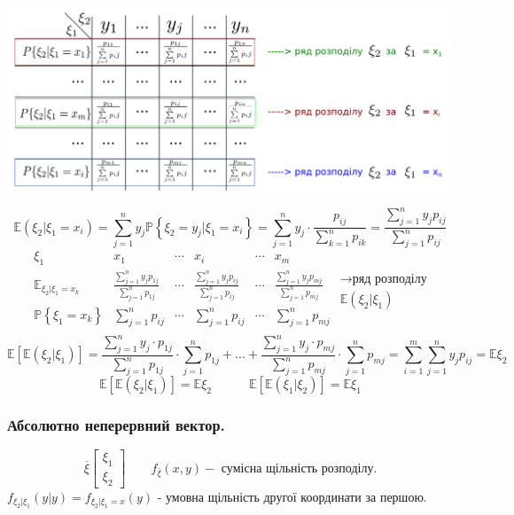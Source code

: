 \begin{center}
\includegraphics[scale=0.28]{images/20.png} \end{center}
$$
\mathbb{E}(\xi_2 | \xi_1 = x_i)  =  \sum\limits_{j = 1}^{ n}{ y_j \mathbb{P} \left\lbrace \xi_2 = y_j | \xi_1 = x_i \right\rbrace } =  \sum\limits_{j = 1}^{n}{ y_{j} \cdot \frac{p_{ij} }{  \sum\limits_{k = 1}^{ n}{p_{ik}}}}= \frac{  \sum\limits_{j = 1}^{ n}{ y_j p_{ij}}}{  \sum\limits_{j = 1}^{n}{ p_{ij}}}
$$
$$
\begin{matrix}
	\xi_1 & x_1 & \cdots  &x_i & \cdots & x_m \\
	\mathbb{E}_{\xi_2 | \xi_1=x_k}  &  \frac{  \sum\limits_{j = 1}^{ n}{ y_j p_{1j}}}{  \sum\limits_{j = 1}^{n}{ p_{1j}}}  & \cdots  &\frac{  \sum\limits_{j = 1}^{ n}{ y_j p_{ij}}}{  \sum\limits_{j = 1}^{n}{ p_{ij}}}  & \cdots & \frac{  \sum\limits_{j = 1}^{ n}{ y_j p_{mj}}}{  \sum\limits_{j = 1}^{n}{ p_{mj}}}  \\
	\mathbb{P} \left\lbrace \xi_1 = x_k \right\rbrace &   \sum\limits_{j = 1}^{n}{ p_{ij}} & \cdots  &\sum\limits_{j = 1}^{n}{ p_{ij}} & \cdots & \sum\limits_{j = 1}^{n}{ p_{mj}} \\
\end{matrix}
\begin{gathered}
\longrightarrow \text{ряд розподілу}\\
\mathbb{E}(\xi_2| \xi_1)
\end{gathered}
$$
$$
\mathbb{E}[ \mathbb{E} (\xi_2 | \xi_1)] =
\frac{  \sum\limits_{j = 1}^{n}  {y_j \cdot p_{1j}} }   {  \sum\limits_{j = 1}^{ n}{ p_{1j}}} \cdot  \sum\limits_{j = 1}^{ n}{ p_{1j}}+ ... +
\frac{  \sum\limits_{j = 1}^{n}{y_j \cdot p_{mj}} }   {  \sum\limits_{j = 1}^{ n}{ p_{mj}}} \cdot  \sum\limits_{j = 1}^{ n}{ p_{mj}} =  \sum\limits_{i = 1}^{m}{  \sum\limits_{j =1 }^{ n}{ y_j p_{ij}}} = \mathbb{E}\xi_2
$$
$$
\mathbb{E}[ \mathbb{E} (\xi_2 | \xi_1)] = \mathbb{E}  \xi_2  \quad \quad \quad \mathbb{E}[ \mathbb{E} (\xi_1 | \xi_2)] = \mathbb{E}  \xi_1
$$
\subsubsection{Абсолютно неперервний вектор.}
$$
\overline{\xi}  \begin{bmatrix}
 \xi_1 \\ \xi_2
\end{bmatrix} \qquad f_{\overline{\xi}} (x,y) - \text{ сумісна щільність розподілу.}
$$
$
f_{\xi_2 | \xi_1} (y|y) = f_{\xi_2| \xi_1 = x} (y)
$ - умовна щільність другої координати за першою.\\

